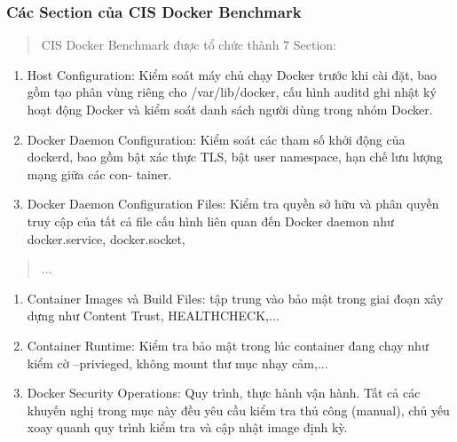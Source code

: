 \subsubsection{Các Section của CIS Docker Benchmark}\label{cuxe1c-section-cux1ee7a-cis-docker-benchmark}

\begin{quote}
CIS Docker Benchmark được tổ chức thành 7 Section:
\end{quote}

\begin{enumerate}
\def\labelenumi{(\arabic{enumi})}
\item
  Host Configuration: Kiểm soát máy chủ chạy Docker trước khi cài đặt, bao gồm tạo phân vùng riêng cho /var/lib/docker, cấu hình auditd ghi nhật ký hoạt động Docker và kiểm soát danh sách người dùng trong nhóm Docker.
\item
  Docker Daemon Configuration: Kiểm soát các tham số khởi động của dockerd, bao gồm bật xác thực TLS, bật user namespace, hạn chế lưu lượng mạng giữa các con- tainer.
\item
  Docker Daemon Configuration Files: Kiểm tra quyền sở hữu và phân quyền truy cập của tất cả file cấu hình liên quan đến Docker daemon như docker.service, docker.socket,
\end{enumerate}

\begin{quote}
...
\end{quote}

\begin{enumerate}
\def\labelenumi{(\arabic{enumi})}
\setcounter{enumi}{3}
\item
  Container Images và Build Files: tập trung vào bảo mật trong giai đoạn xây dựng như Content Trust, HEALTHCHECK,...
\item
  Container Runtime: Kiểm tra bảo mật trong lúc container đang chạy như kiểm cờ --privieged, không mount thư mục nhạy cảm,...
\item
  Docker Security Operations: Quy trình, thực hành vận hành. Tất cả các khuyến nghị trong mục này đều yêu cầu kiểm tra thủ công (manual), chủ yếu xoay quanh quy trình kiểm tra và cập nhật image định kỳ.
\end{enumerate}

